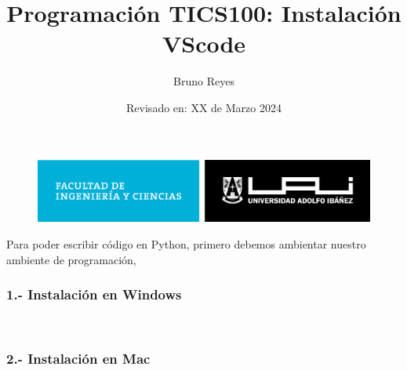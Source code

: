 \documentclass{article}
\begin{document}
\begin{figure}
    \centering
    \includegraphics[width=0.7\linewidth]{../img/facultad-de-ingenieria-y-ciencias.png} 
\end{figure}

\title{Programación TICS100: Instalación VScode}
\author{Bruno Reyes}
\date{Revisado en: XX de Marzo 2024}


\maketitle

Para poder escribir código en Python, primero debemos ambientar nuestro ambiente de programación,


\subsubsection*{1.- Instalación en Windows}\\


\subsubsection*{2.- Instalación en Mac}
\end{document}

